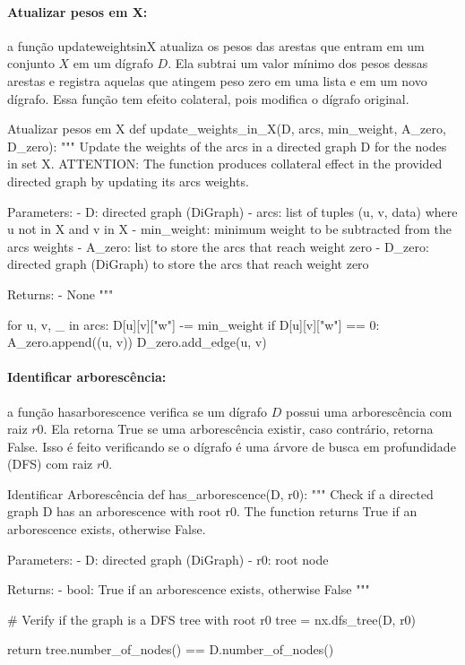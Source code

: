 \documentclass[12pt,a4paper]{article}
\def\texttt#1{#1}%
\def\_{}%
\begin{document}
\paragraph{Atualizar pesos em X:}
a função \texttt{update\_weights\_in\_X} atualiza os pesos das arestas que entram em um conjunto \(X\) em um dígrafo \(D\). Ela subtrai um valor mínimo dos pesos dessas arestas e registra aquelas que atingem peso zero em uma lista e em um novo dígrafo. Essa função tem efeito colateral, pois modifica o dígrafo original.

\begin{pybox}{Atualizar pesos em X}
def update_weights_in_X(D, arcs, min_weight, A_zero, D_zero):
    """
    Update the weights of the arcs in a directed graph D for the nodes in set X.
    ATTENTION: The function produces collateral effect in the provided directed graph by updating its arcs weights.

    Parameters:
        - D: directed graph (DiGraph)
        - arcs: list of tuples (u, v, data) where u not in X and v in X
        - min_weight: minimum weight to be subtracted from the arcs weights
        - A_zero: list to store the arcs that reach weight zero
        - D_zero: directed graph (DiGraph) to store the arcs that reach weight zero

    Returns:
        - None
    """

    for u, v, _ in arcs:
        D[u][v]["w"] -= min_weight
        if D[u][v]["w"] == 0:
            A_zero.append((u, v))
            D_zero.add_edge(u, v)

\end{pybox}

\paragraph{Identificar arborescência:}
a função \texttt{has\_arborescence} verifica se um dígrafo \(D\) possui uma arborescência com raiz \(r0\). Ela retorna True se uma arborescência existir, caso contrário, retorna False. Isso é feito verificando se o dígrafo é uma árvore de busca em profundidade (DFS) com raiz \(r0\).

\begin{pybox}{Identificar Arborescência}
def has_arborescence(D, r0):
    """
    Check if a directed graph D has an arborescence with root r0.
    The function returns True if an arborescence exists, otherwise False.

    Parameters:
        - D: directed graph (DiGraph)
        - r0: root node

    Returns:
        - bool: True if an arborescence exists, otherwise False
    """

    # Verify if the graph is a DFS tree with root r0
    tree = nx.dfs_tree(D, r0)

    return tree.number_of_nodes() == D.number_of_nodes()
\end{pybox}
\end{document}
